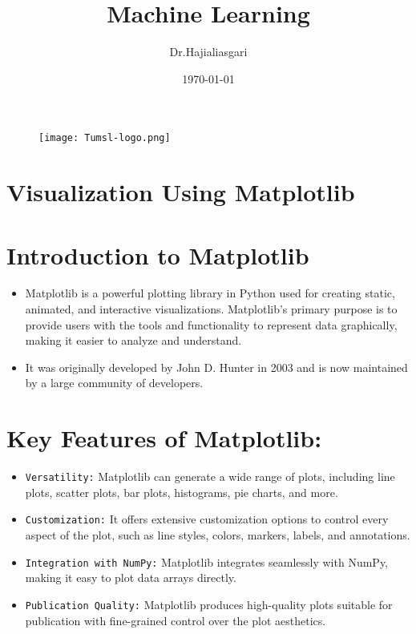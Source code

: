 \documentclass[serif, aspectratio=169]{beamer}
\author{Dr.Hajialiasgari}
\title{Machine Learning}
\institute{
    Tehran University \\
    Of\\
    Medical Science
}
\date{\small \today}
\begin{document}
\begin{frame}
    \titlepage
    \vspace*{-0.6cm}
    \begin{figure}[htpb]
        \begin{center}
            \texttt{[image: Tumsl-logo.png]}
        \end{center}
    \end{figure}
\end{frame}

\begin{frame}    
\tableofcontents[sectionstyle=show, subsectionstyle=show/shaded/hide, subsubsectionstyle=show/shaded/hide]
\end{frame}

\section{Visualization Using Matplotlib
}
\section{Introduction to Matplotlib}
\begin{frame}
    \begin{itemize}
        \item Matplotlib is a powerful plotting library in Python used for creating static, animated, and interactive visualizations. Matplotlib’s primary purpose is to provide users with the tools and functionality to represent data graphically, making it easier to analyze and understand. \item It was originally developed by John D. Hunter in 2003 and is now maintained by a large community of developers.
    \end{itemize}
\end{frame}
\section{Key Features of Matplotlib:}
\begin{frame}
    \begin{itemize}
        \item \texttt{\color{red}Versatility:} Matplotlib can generate a wide range of plots, including line plots, scatter plots, bar plots, histograms, pie charts, and more.
        \item \texttt{\color{red}Customization:} It offers extensive customization options to control every aspect of the plot, such as line styles, colors, markers, labels, and annotations.
        \item \texttt{\color{red}Integration with NumPy:} Matplotlib integrates seamlessly with NumPy, making it easy to plot data arrays directly.
        \item \texttt{\color{red}Publication Quality:} Matplotlib produces high-quality plots suitable for publication with fine-grained control over the plot aesthetics.
    \end{itemize}
\end{frame}
\end{document}
